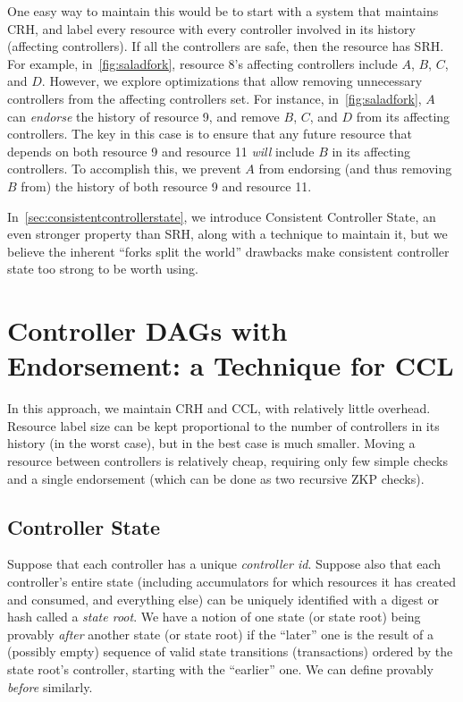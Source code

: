 \documentclass[a4paper,USenglish,cleveref, autoref, thm-restate, anonymous]{lipics-v2021}
\begin{document}
One easy way to maintain this would be to start with a system that maintains CRH, and label every resource with every controller involved in its history (affecting controllers). 
If all the controllers are safe, then the resource has SRH. 
For example, in~\cref{fig:saladfork}, resource 8's affecting controllers include $A$, $B$, $C$, and $D$.
However, we explore optimizations that allow removing unnecessary controllers from the affecting controllers set.
For instance, in~\cref{fig:saladfork}, $A$ can \emph{endorse} the history of resource 9, and remove $B$, $C$, and $D$ from its affecting controllers.
The key in this case is to ensure that any future resource that depends on both resource 9 and resource 11 \emph{will} include $B$ in its affecting controllers.
To accomplish this, we prevent $A$ from endorsing (and thus removing $B$ from) the history of both resource 9 and resource 11.

In~\cref{sec:consistentcontrollerstate}, we introduce Consistent Controller State, an even stronger property than SRH, along with a technique to maintain it, but we believe the inherent ``forks split the world'' drawbacks  make consistent controller state too strong to be worth using.

\section{Controller DAGs with Endorsement: a Technique for CCL}
\label{sec:dagswithendorsement}
In this approach, we maintain CRH and CCL, with relatively little overhead.
Resource label size can be kept proportional to the number of controllers in its history (in the worst case), but in the best case is much smaller.
Moving a resource between controllers is relatively cheap, requiring only few simple checks and a single endorsement (which can be done as two recursive ZKP checks).

\subsection{Controller State}
Suppose that each controller has a unique \emph{controller id}.
Suppose also that each controller's entire state (including accumulators for which resources it has created and consumed, and everything else) can be uniquely identified with a digest or hash called a \emph{state root}.
We have a notion of one state (or state root) being provably \emph{after} another state (or state root) if the ``later'' one is the result of a (possibly empty) sequence of valid state transitions (transactions) ordered by the state root's controller, starting with the ``earlier'' one. 
We can define provably \emph{before} similarly. 
\end{document}
